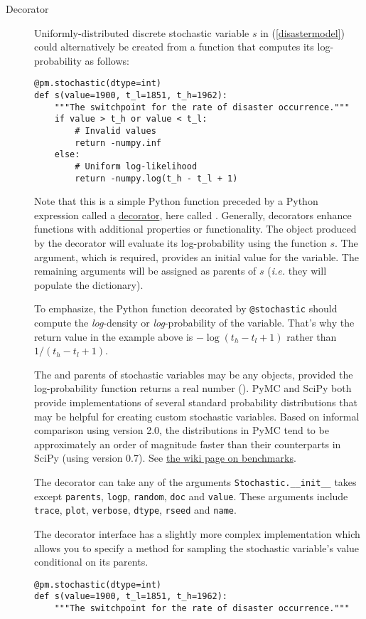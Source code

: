 \begin{description}
    \item[Decorator] Uniformly-distributed discrete stochastic variable $s$ in (\ref{disastermodel}) could alternatively be created from a function that computes its log-probability as follows:
\begin{verbatim}
@pm.stochastic(dtype=int)
def s(value=1900, t_l=1851, t_h=1962):
    """The switchpoint for the rate of disaster occurrence."""
    if value > t_h or value < t_l:
        # Invalid values
        return -numpy.inf
    else:
        # Uniform log-likelihood
        return -numpy.log(t_h - t_l + 1)
\end{verbatim}
Note that this is a simple Python function preceded by a Python expression called a \href{http://docs.python.org/glossary.html#term-decorator}{decorator}, here called . Generally, decorators enhance functions with additional properties or functionality. The  object produced by the  decorator will evaluate its log-probability using the function $s$. The  argument, which is required, provides an initial value for the variable. The remaining arguments will be assigned as parents of $s$ (\emph{i.e.} they will populate the  dictionary).

To emphasize, the Python function decorated by \texttt{@stochastic} should compute the \emph{log}-density or \emph{log}-probability of the variable. That's why the return value in the example above is $-\log(t_h-t_l+1)$ rather than $1/(t_h-t_l+1)$.

The  and parents of stochastic variables may be any objects, provided the log-probability function returns a real number (). PyMC and SciPy both provide implementations of several standard probability distributions that may be helpful for creating custom stochastic variables. Based on informal comparison using version 2.0, the distributions in PyMC tend to be approximately an order of magnitude faster than their counterparts in SciPy (using version 0.7). See \href{http://code.google.com/p/pymc/wiki/Benchmarks}{the wiki page on benchmarks}.

    The decorator  can take any of the arguments \texttt{Stochastic.__init__} takes except \texttt{parents}, \texttt{logp}, \texttt{random}, \texttt{doc} and \texttt{value}. These arguments include \texttt{trace}, \texttt{plot}, \texttt{verbose}, \texttt{dtype}, \texttt{rseed} and \texttt{name}.

    The decorator interface has a slightly more complex implementation which allows you to specify a  method for sampling the stochastic variable's value conditional on its parents.
    \begin{verbatim}
@pm.stochastic(dtype=int)
def s(value=1900, t_l=1851, t_h=1962):
    """The switchpoint for the rate of disaster occurrence."""


\end{verbatim}
\end{description}
